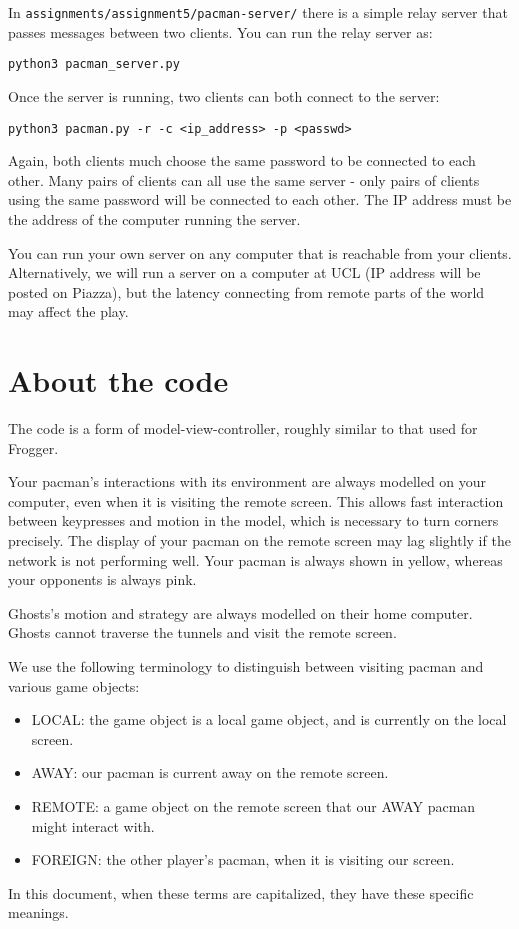 \documentclass{article}
\begin{document}
In {\tt assignments/assignment5/pacman-server/} there is a simple
relay server that passes messages between two clients.  You can run
the relay server as:

\begin{verbatim}
python3 pacman_server.py
\end{verbatim}

Once the server is running, two clients can both connect to the server:

\begin{verbatim}
python3 pacman.py -r -c <ip_address> -p <passwd>
\end{verbatim}

Again, both clients much choose the same password to be connected to
each other.  Many pairs of clients can all use the same server - only
pairs of clients using the same password will be connected to each
other.  The IP address must be the address of the computer running the
server.

You can run your own server on any computer that is reachable from
your clients.  Alternatively, we will run a server on a computer at
UCL (IP address will be posted on Piazza), but the latency connecting
from remote parts of the world may affect the play.

\section{About the code}

The code is a form of model-view-controller, roughly similar to that
used for Frogger.

Your pacman's interactions with its environment are always modelled on
your computer, even when it is visiting the remote screen.  This
allows fast interaction between keypresses and motion in the model,
which is necessary to turn corners precisely.  The display of your
pacman on the remote screen may lag slightly if the network is not
performing well.  Your pacman is always shown in yellow, whereas your
opponents is always pink.

Ghosts's motion and strategy are always modelled on their home
computer. Ghosts cannot traverse the tunnels and visit the remote
screen.

We use the following terminology to distinguish between visiting pacman and various game objects:
\begin{itemize}
\item{LOCAL}: the game object is a local game object, and is currently on the local screen.
\item{AWAY}: our pacman is current away on the remote screen.
\item{REMOTE}: a game object on the remote screen that our AWAY pacman might interact with.
\item{FOREIGN}: the other player's pacman, when it is visiting our screen.
\end{itemize}
In this document, when these terms are capitalized, they have these
specific meanings.  
\end{document}
